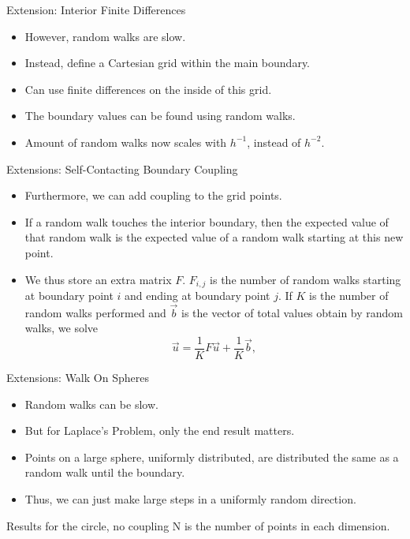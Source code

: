 \documentclass{beamer}
\newcommand\mat[1]{#1}
\begin{document}
\begin{frame}{Extension: Interior Finite Differences}
\begin{itemize}
\item However, random walks are slow.
\item Instead, define a Cartesian grid within the main boundary.
\item Can use finite differences on the inside of this grid.
\item The boundary values can be found using random walks.
\item Amount of random walks now scales with $h^{-1}$, instead of $h^{-2}$.
\end{itemize}
\end{frame}

\begin{frame}{Extensions: Self-Contacting Boundary Coupling}
\begin{itemize}
\item Furthermore, we can add coupling to the grid points.
\item If a random walk touches the interior boundary,
then the expected value of that random walk
is the expected value of a random walk starting at this new point.
\item We thus store an extra matrix $\mat{F}$.
$F_{i,j}$ is the number of random walks starting at boundary point $i$
and ending at boundary point $j$.
If $K$ is the number of random walks performed
and $\vec{b}$ is the vector of total values obtain by random walks,
we solve
$$\vec{u}=\frac{1}{K}\mat{F}\vec{u}+\frac{1}{K}\vec{b},$$
\end{itemize}
\end{frame}

\begin{frame}{Extensions: Walk On Spheres}
\begin{itemize}
\item Random walks can be slow.
\item But for Laplace's Problem, only the end result matters.
\item Points on a large sphere, uniformly distributed,
are distributed the same as a random walk until the boundary.
\item Thus, we can just make large steps in a uniformly random direction.
\end{itemize}
\end{frame}
Results for the circle, no coupling
N is the number of points in each dimension.
\end{document}
